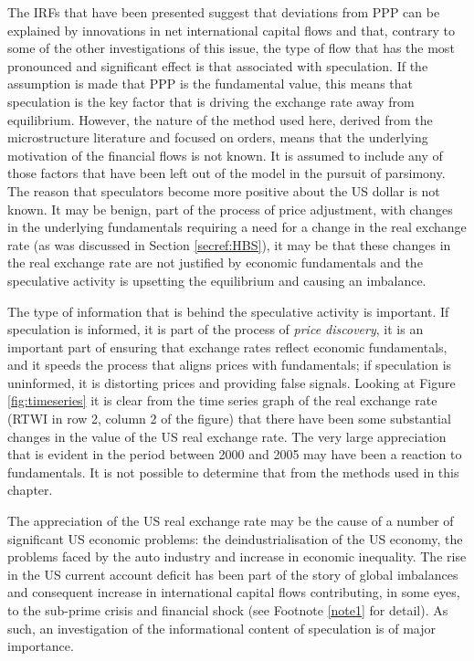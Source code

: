 \documentclass[12pt, a4paper, oneside]{article}\usepackage[]{graphicx}\usepackage[]{color}
\begin{document}
The IRFs that have been presented suggest that deviations from PPP can be explained by innovations in net international capital flows and that, contrary to some of the other investigations of this issue, the type of flow that has the most pronounced and significant effect is that associated with speculation.  If the assumption is made that PPP is the fundamental value, this means that speculation is the key factor that is driving the exchange rate away from equilibrium.  However, the nature of the method used here, derived from the microstructure literature and focused on orders, means that the underlying motivation of the financial flows is not known.  It is  assumed to include any of those factors that have been left out of the model in the pursuit of parsimony.  The reason that speculators become more positive about the US dollar is not known.  It may be benign, part of the process of price adjustment, with changes in the underlying fundamentals requiring a need for a change in the real exchange rate (as was discussed in Section \ref{secref:HBS}), it may be that these changes in the real exchange rate are not justified by economic fundamentals and the speculative activity is upsetting the equilibrium and causing an imbalance. 

The type of information that is behind the speculative activity is important.  If speculation is informed, it is part of the process of \emph{price discovery}, it is an important part of ensuring that exchange rates reflect economic fundamentals, and it speeds the process that aligns prices with fundamentals; if speculation is uninformed, it is distorting prices and providing false signals.  Looking at Figure \ref{fig:timeseries} it is clear from the time series graph of the real exchange rate (RTWI in row 2, column 2 of the figure) that there have been some substantial changes in the value of the US real exchange rate.  The very large appreciation that is evident in the period between 2000 and 2005 may have been a reaction to fundamentals.  It is not possible to determine that from the methods used in this chapter.  

The appreciation of the US real exchange rate may be the cause of a number of significant US economic problems:  the deindustrialisation of the US economy, the problems faced by the auto industry and increase in economic inequality.  The rise in the US current account deficit has been part of the story of global imbalances and consequent increase in international capital flows contributing, in some eyes, to the  sub-prime crisis and financial shock (see Footnote \ref{note1} for detail).  As such, an investigation of the informational content of speculation is of major importance.  
\end{document}
